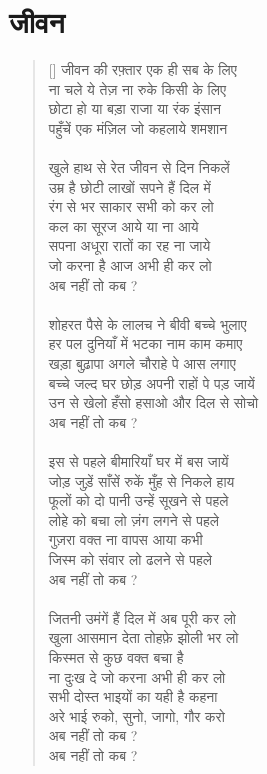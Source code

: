 
\chapter{\texthindi{जीवन}}

\begin{verse}[\versewidth]\texthindi{
जीवन की रफ़्तार एक ही सब के लिए\\
ना चले ये तेज़ ना रुके किसी के लिए\\
छोटा हो या बड़ा राजा या रंक इंसान\\
पहुँचें एक मंज़िल जो कहलाये शमशान\\
\\
खुले हाथ से रेत जीवन से दिन निकलें\\
उम्र है छोटी लाखों सपने हैं दिल में\\
रंग से भर साकार सभी को कर लो\\
कल का सूरज आये या ना आये\\
सपना अधूरा रातों का रह ना जाये\\
जो करना है आज अभी ही कर लो\\
अब नहीं तो कब ?\\
\\
शोहरत पैसे के लालच ने बीवी बच्चे भुलाए\\
हर पल दुनियाँ में भटका नाम काम कमाए\\
खड़ा बुढ़ापा अगले चौराहे पे आस लगाए\\
बच्चे जल्द घर छोड़ अपनी राहों पे पड़ जायें\\
उन से खेलो हँसो हसाओ और दिल से सोचो\\
अब नहीं तो कब ?\\
\\
इस से पहले बीमारियाँ घर में बस जायें\\
जोड़ जुड़ें साँसें रुकें मुँह से निकले हाय\\
फूलों को दो पानी उन्हें सूखने से पहले\\
लोहे को बचा लो ज़ंग लगने से पहले\\
गुज़रा वक्त ना वापस आया कभी\\
जिस्म को संवार लो ढलने से पहले\\
अब नहीं तो कब ?\\
\\
जितनी उमंगें हैं दिल में अब पूरी कर लो\\
खुला आसमान देता तोहफ़े झोली भर लो\\
किस्मत से कुछ वक्त बचा है\\
ना दुःख दे जो करना अभी ही कर लो\\
सभी दोस्त भाइयों का यही है कहना\\
अरे भाई रुको, सुनो, जागो, गौर करो\\
अब नहीं तो कब ?\\
अब नहीं तो कब ?
}
\end{verse}

